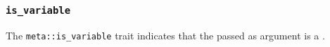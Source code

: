 
\subsubsection{\texttt{is\_variable}}

The \texttt{meta::is\_variable}
trait indicates that the  passed as argument is a .


